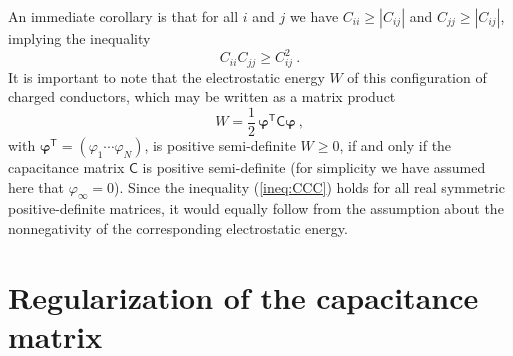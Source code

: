 \documentclass[12pt]{iopart}
\newcommand{\be}{\begin{equation}}
\newcommand{\ee}{\end{equation}}
\newcommand{\mx}[1]{\bm{\mathsf{#1}}}
\newcommand{\trans}{^{\mathsf{T}}}
\newcommand{\0}{\vct{0}}
\theoremstyle{plain} \newtheorem{tm}{Theorem}[section]
\theoremstyle{plain} \newtheorem{lm}[tm]{Lemma}
\theoremstyle{definition} \newtheorem{defn}[tm]{Definition}
\begin{document}
\medskip



An immediate corollary is that for all $i$ and $j$ we have $C_{ii} \ge |C_{ij}|$ and $C_{jj} \ge |C_{ij}|$, implying the inequality
\be\label{ineq:CCC}
C_{ii} C_{jj} \ge C_{ij}^2 \ .
\ee
It is important to note that the electrostatic energy $W$ of this configuration of charged conductors, which may be written as a matrix product
\be
W = \frac{1}{2} \, \bm{\varphi}\trans \mx{C} \bm{\varphi} \ ,
\ee
with $\bm{\varphi}\trans = (\varphi_1 \cdots \varphi_N)$, is positive semi-definite $W \ge 0$, if and only if the capacitance matrix $\mx{C}$ is positive semi-definite (for simplicity we have assumed here that $\varphi_\infty = 0$). Since the inequality (\ref{ineq:CCC}) holds for all real symmetric positive-definite matrices, it would equally follow from the assumption about the nonnegativity of the corresponding electrostatic energy.

\bigskip





\section{Regularization of the capacitance matrix} %
\end{document}
